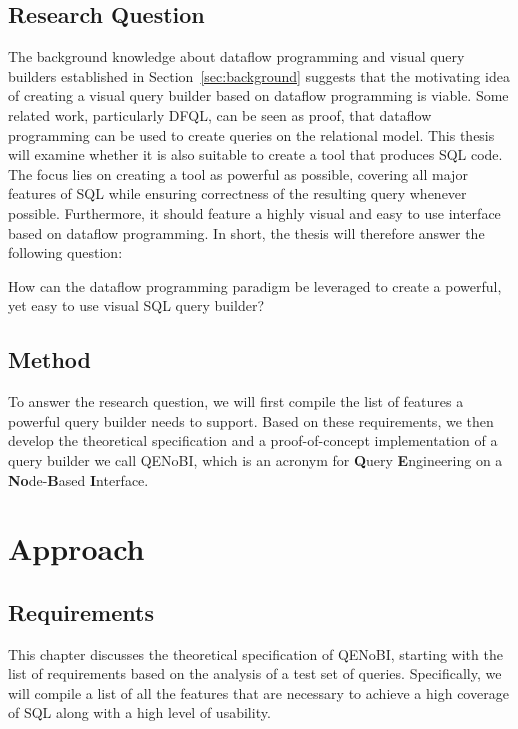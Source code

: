 \documentclass[11pt,a4paper]{globis-book}
\begin{document}
\section{Research Question}
\label{sec:res_question}
The background knowledge about dataflow programming and visual query builders established in Section~\ref{sec:background} suggests that the motivating idea of creating a visual query builder based on dataflow programming is viable. Some related work, particularly DFQL, can be seen as proof, that dataflow programming can be used to create queries on the relational model. This thesis will examine whether it is also suitable to create a tool that produces SQL code. The focus lies on creating a tool as powerful as possible, covering all major features of SQL while ensuring correctness of the resulting query whenever possible. Furthermore, it should feature a highly visual and easy to use interface based on dataflow programming. In short, the thesis will therefore answer the following question:

How can the dataflow programming paradigm be leveraged to create a powerful, yet easy to use visual SQL query builder?

\section{Method}
To answer the research question, we will first compile the list of features a powerful query builder needs to support. Based on these requirements, we then develop the theoretical specification and a proof-of-concept implementation of a query builder we call QENoBI, which is an acronym for \textbf{Q}uery \textbf{E}ngineering on a \textbf{No}de-\textbf{B}ased \textbf{I}nterface.


\chapter{Approach}
\label{ch:approach}

\section{Requirements}
\label{sec:requirements}
This chapter discusses the theoretical specification of QENoBI, starting with the list of requirements based on the analysis of a test set of queries. Specifically, we will compile a list of all the features that are necessary to achieve a high coverage of SQL along with a high level of usability.
\end{document}
